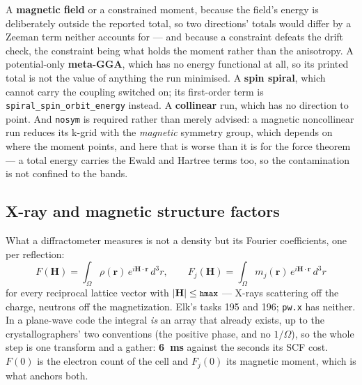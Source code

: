 \documentclass[11pt,a4paper]{article}
\newcommand{\code}[1]{\texttt{\small #1}}
\begin{document}
\begin{refuses}
A \textbf{magnetic field} or a constrained moment, because the field's energy is
deliberately outside the reported total, so two directions' totals would differ
by a Zeeman term neither accounts for --- and because a constraint defeats the
drift check, the constraint being what holds the moment rather than the
anisotropy. A potential-only \textbf{meta-GGA}, which has no energy functional
at all, so its printed total is not the value of anything the run minimised. A
\textbf{spin spiral}, which cannot carry the coupling switched on; its
first-order term is \code{spiral\_spin\_orbit\_energy} instead. A
\textbf{collinear} run, which has no direction to point. And \code{nosym} is
required rather than merely advised: a magnetic noncollinear run reduces its
k-grid with the \emph{magnetic} symmetry group, which depends on where the
moment points, and here that is worse than it is for the force theorem --- a
total energy carries the Ewald and Hartree terms too, so the contamination is
not confined to the bands.
\end{refuses}

\subsection{X-ray and magnetic structure factors}

What a diffractometer measures is not a density but its Fourier coefficients,
one per reflection:
\begin{equation*}
  F(\mathbf H) = \int_\Omega \rho(\mathbf r)\, e^{i\mathbf H\cdot\mathbf r}\,d^3r,
  \qquad
  F_j(\mathbf H) = \int_\Omega m_j(\mathbf r)\, e^{i\mathbf H\cdot\mathbf r}\,d^3r
\end{equation*}
for every reciprocal lattice vector with $|\mathbf H| \le \code{hmax}$ --- X-rays
scattering off the charge, neutrons off the magnetization. Elk's tasks 195 and
196; \code{pw.x} has neither. In a plane-wave code the integral \emph{is} an
array that already exists, up to the crystallographers' two conventions (the
positive phase, and no $1/\Omega$), so the whole step is one transform and a
gather: \textbf{6~ms} against the seconds its SCF cost. $F(0)$ is the electron
count of the cell and $F_j(0)$ its magnetic moment, which is what anchors both.
\end{document}
